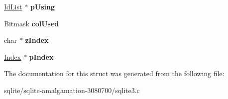 \begin{DoxyCompactItemize}
\item 
\hypertarget{struct_src_list_1_1_src_list__item_a38ecf205dcaebad098b73c56e48ba944}{\hyperlink{struct_id_list}{Id\+List} $\ast$ {\bfseries p\+Using}}\label{struct_src_list_1_1_src_list__item_a38ecf205dcaebad098b73c56e48ba944}

\item 
\hypertarget{struct_src_list_1_1_src_list__item_a4fd7e7e26995048b58006d020e8c48d6}{Bitmask {\bfseries col\+Used}}\label{struct_src_list_1_1_src_list__item_a4fd7e7e26995048b58006d020e8c48d6}

\item 
\hypertarget{struct_src_list_1_1_src_list__item_a72b8e117712e49607b770a462fb42d95}{char $\ast$ {\bfseries z\+Index}}\label{struct_src_list_1_1_src_list__item_a72b8e117712e49607b770a462fb42d95}

\item 
\hypertarget{struct_src_list_1_1_src_list__item_ab4722e97bd4852c8b84e620185955c28}{\hyperlink{struct_index}{Index} $\ast$ {\bfseries p\+Index}}\label{struct_src_list_1_1_src_list__item_ab4722e97bd4852c8b84e620185955c28}

\end{DoxyCompactItemize}


The documentation for this struct was generated from the following file\+:\begin{DoxyCompactItemize}
\item 
sqlite/sqlite-\/amalgamation-\/3080700/sqlite3.\+c\end{DoxyCompactItemize}
